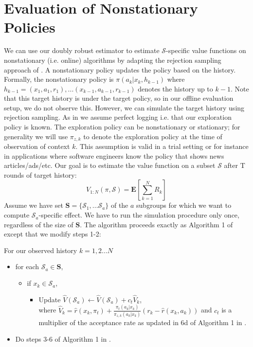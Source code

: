 \section{Evaluation of Nonstationary Policies} \label{nonstationary}
We can use our doubly robust estimator to estimate $\mathcal{S}$-specific value functions  on nonstationary (i.e. online) algorithms by adapting the rejection sampling approach of \cite{dudik2014doubly}. A nonstationary policy updates the policy based on the history. Formally, the nonstationary policy is $\pi(a_k |x_k, h_{k-1})$ where $h_{k-1} = (x_1, a_1, r_1), ...(x_{k-1}, a_{k-1}, r_{k-1})$ denotes the history up to $k-1$. Note that this target history is under the target policy, so in our offline evaluation setup, we do not observe this. However, we can simulate the target history using rejection sampling. As in \cite{dudik2014doubly} we assume perfect logging i.e. that our exploration policy is known. The exploration policy can be nonstationary or stationary; for generality we will use $\pi_{z,k}$ to denote the exploration policy at the time of observation of context $k$. This assumption is valid in a trial setting or for instance in applications where software engineers know the policy that shows news articles/ads/etc. Our goal is to estimate the value function on a subset $\mathcal{S}$ after T rounds of target history: 
\begin{equation}
    V_{1:N}(\pi, \mathcal{S}) = \mathbf{E}[\sum_{k=1}^N R_k]
\end{equation}
Assume we have set $\mathbf{S} = \{\mathcal{S}_1, ... \mathcal{S}_a \} $ of the $a$ subgroups for which we want to compute $\mathcal{S}_a$-specific effect. We have to run the simulation procedure only once, regardless of the size of $\mathbf{S}$. The algorithm proceeds exactly as Algorithm 1 of  \cite{dudik2014doubly} except that we modify steps 1-2:

For our observed history $k=1,2...N$ 
\begin{itemize}
    \item for each $\mathcal{S}_a \in \mathbf{S}$,
    \begin{itemize}
        \item if $x_k \in \mathcal{S}_a$,
        \begin{itemize}
            \item Update $\hat{V}(\mathcal{S}_a) \leftarrow \hat{V}(\mathcal{S}_a) + c_t \hat{V}_k$, \\
            where $\hat{V}_k = \hat{r}(x_k, \pi_t) + \frac{\pi_t(a_k|x_k)}{\pi_{z,k}(a_k |x_k)} (r_k - \hat{r}(x_k, a_k))$ and $c_t$ is a multiplier of the acceptance rate as updated in 6d of Algorithm 1 in \cite{dudik2014doubly}.
        \end{itemize}
    \end{itemize}
    \item Do steps 3-6 of Algorithm 1 in \cite{dudik2014doubly}.
\end{itemize}
